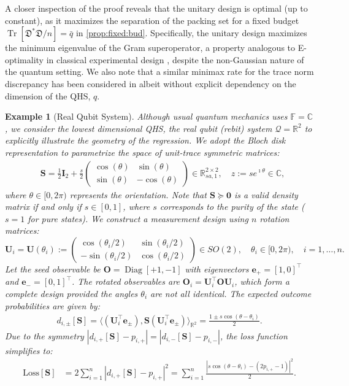 \documentclass[noinfoline]{imsart}\setcounter{tocdepth}{2}
\renewcommand{\b}[1]{\mathbb{#1}} %
\newcommand{\m}[1]{\mathbf{#1}} %
\newcommand{\f}[1]{\mathfrak{#1}} %
\renewcommand{\c}[1]{\mathcal{#1}} %
\newcommand{\tr}[1]{\operatorname{Tr}\left[#1\right]}
\newcommand{\Diag}{\operatorname{Diag}}
\theoremstyle{plain}
\newtheorem{example}[theorem]{Example}
\begin{document}
A closer inspection of the proof reveals that the unitary design is optimal (up to constant), as it maximizes the separation of the packing set for a fixed budget $\tr{\f{D}^{*} \f{D}/n} = \bar{q}$ in \cref{prop:fixed:bud}. Specifically, the unitary design maximizes the minimum eigenvalue of the Gram superoperator, a property analogous to E-optimality in classical experimental design \cite{pukelsheim2006optimal}, despite the non-Gaussian nature of the quantum setting.
We also note that a similar minimax rate for the trace norm discrepancy has been considered in \cite{butucea2025sample} albeit without explicit dependency on the dimension of the QHS, $q$.


\begin{example}[Real Qubit System]
Although usual quantum mechanics uses $\b{F} = \b{C}$, we consider the lowest dimensional QHS, the real qubit (\emph{rebit}) system $\c{Q} = \b{R}^{2}$ to explicitly illustrate the geometry of the regression. We adopt the \emph{Bloch disk representation} to parametrize the space of unit-trace symmetric matrices:
\begin{align*}
    &\m{S} = \frac{1}{2} \m{I}_{2} + \frac{s}{2} \begin{pmatrix}
        \cos(\theta) & \sin(\theta) \\
        \sin(\theta) & -\cos(\theta)
    \end{pmatrix}  \in \b{R}_{sa, 1}^{2 \times 2}, \quad z := s e^{\imath \theta} \in \b{C},
\end{align*}
where $\theta \in [0, 2\pi)$ represents the orientation. Note that $\m{S} \succeq \m{0}$ is a valid density matrix if and only if $s \in [0, 1]$, where $s$ corresponds to the purity of the state ($s=1$ for pure states).
We construct a measurement design using $n$ rotation matrices:
\begin{equation*}
    \m{U}_{i} = \m{U}(\theta_{i}) := \begin{pmatrix}
        \cos (\theta_{i}/2) & \sin (\theta_{i}/2) \\
        -\sin (\theta_{i}/2) & \cos (\theta_{i}/2)
    \end{pmatrix} \in SO(2), \quad \theta_{i} \in [0, 2\pi), \quad i = 1, \dots, n.
\end{equation*}
Let the seed observable be $\m{O} = \Diag[+1, -1]$ with eigenvectors $\m{e}_{+} = [1, 0]^{\top}$ and $\m{e}_{-} = [0, 1]^{\top}$. The rotated observables are $\m{O}_{i} = \m{U}_{i}^{\top} \m{O} \m{U}_{i}$, which form a complete design provided the angles $\theta_{i}$ are not all identical. The expected outcome probabilities are given by:
\begin{align*}
    d_{i,\pm}[\m{S}] = \langle (\m{U}_{i}^{\top} \m{e}_{\pm}), \m{S} (\m{U}_{i}^{\top} \m{e}_{\pm}) \rangle_{\b{R}^{2}} = \frac{1 \pm s \cos (\theta - \theta_{i})}{2}.
\end{align*}
Due to the symmetry $|d_{i, +}[\m{S}] - p_{i, +}| = |d_{i, -}[\m{S}] - p_{i, -}|$, the loss function simplifies to:
\begin{align*}
    \mathrm{Loss}[\m{S}] &= 2 \sum_{i=1}^{n} |d_{i, +}[\m{S}] - p_{i, +}|^{2} = \sum_{i=1}^{n} \frac{\left|s \cos (\theta - \theta_{i}) - \left(2 p_{i, +} - 1\right) \right|^{2}}{2} .
\end{align*}


\end{example}
\end{document}
